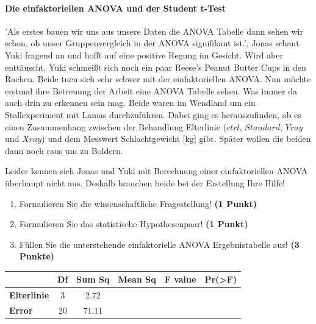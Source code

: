 \documentclass[a4paper, 9pt]{scrartcl}\usepackage[]{graphicx}\usepackage[]{xcolor}
\begin{document}
\ifcollection
\paragraph{Die einfaktoriellen ANOVA und der Student t-Test}
\fi

'Als erstes bauen wir uns aus unsere Daten die ANOVA Tabelle dann sehen wir schon, ob unser Gruppenvergleich in der ANOVA signifikant ist.', Jonas schaut Yuki fragend an und hofft auf eine positive Regung im Gesicht. Wird aber enttäuscht. Yuki schmeißt sich noch ein paar Reese's Peanut Butter Cups in den Rachen. Beide tuen sich sehr schwer mit der einfaktoriellen ANOVA. Nun möchte erstmal ihre Betreuung der Arbeit eine ANOVA Tabelle sehen. Was immer da auch drin zu erkennen sein mag. Beide waren im Wendland um ein Stallexperiment mit Lamas durchzuführen. Dabei ging es herauszufinden, ob es einen Zusammenhang zwischen der Behandlung Elterlinie ($ctrl$, $Standard$, $Yray$ und $Xray$) und dem Messwert Schlachtgewicht [kg] gibt. Später wollen die beiden dann noch raus um zu Boldern.



\vspace{1ex}

Leider kennen sich Jonas und Yuki mit Berechnung einer einfaktoriellen ANOVA überhaupt nicht aus. Deshalb brauchen beide bei der Erstellung Ihre Hilfe! 

\begin{enumerate}
  \item Formulieren Sie die wissenschaftliche Fragestellung! \textbf{(1 Punkt)}
  \item Formulieren Sie das statistische Hypothesenpaar! \textbf{(1 Punkt)}
\item Füllen Sie die unterstehende einfaktorielle ANOVA Ergebnistabelle aus! \textbf{(3 Punkte)}
\end{enumerate}

\vspace{1Ex}

\begin{center}
  \Large
  \begin{tabular}{lccccp{3cm}}
\toprule
     & \textbf{Df} & \textbf{Sum Sq} & \textbf{Mean Sq} & \textbf{F value} & \textbf{Pr(>F)} \strut\\
    \midrule
   \textbf{Elterlinie}  & 3 & 2.72 &  &  &  \strut\\
   \textbf{Error}  & 20 & 71.11 &  &  &  \strut\\
\bottomrule
  \end{tabular}
\end{center}
\end{document}
